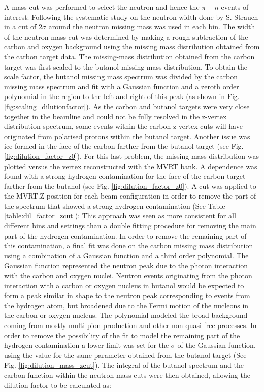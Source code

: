 A mass cut was performed to select the neutron and hence the $\pi + n$ events of interest: Following the systematic study on the neutron width done by S. Strauch in \cite{Strauch_2014} a cut of $2 \sigma$ around the neutron missing mass was used in each bin. The width of the neutron-mass cut was determined by making a rough subtraction of the carbon and oxygen background using the missing mass distribution obtained from the carbon target data. The missing-mass distribution obtained from the carbon target was first scaled to the butanol missing-mass distribution. To obtain the scale factor, the butanol missing mass spectrum was divided by the carbon missing mass spectrum and fit with a Gaussian function and a zeroth order polynomial in the region to the left and right of this peak (as shown in Fig. \ref{fig:scaling_dilutionfactor}). 
As the carbon and butanol targets were very close together in the beamline and could not be fully resolved in the z-vertex distribution spectrum, some events within the carbon z-vertex cuts will have originated from polarised protons within the butanol target. Another issue was ice formed in the face of the carbon farther from the butanol target (see Fig. \ref{fig:dilution_factor_z0}). For this last problem, the missing mass distribution was plotted versus the vertex reconstructed with the MVRT bank. A dependence was found with a strong hydrogen contamination for the face of the carbon target farther from the butanol (see Fig. \ref{fig:dilution_factor_z0}). A cut was applied to the MVRT.Z position for each beam configuration in order to remove the part of the spectrum that showed a strong hydrogen contamination (See Table \ref{table:dil_factor_zcut}): This approach was seen as more consistent for all different bins and settings than a double fitting procedure for removing the main part of the hydrogen contamination. In order to remove the remaining part of this contamination, a final fit was done on the carbon missing mass distribution using a combination of a Gaussian function and a third order polynomial. The Gaussian function represented the neutron peak due to the photon interaction with the carbon and oxygen nuclei. Neutron events originating from the photon interaction with a carbon or oxygen nucleus in butanol would be expected to form a peak similar in shape to the neutron peak corresponding to events from the hydrogen atom, but broadened due to the Fermi motion of the nucleons in the carbon or oxygen nucleus. The polynomial modeled the broad background coming from mostly multi-pion production and other non-quasi-free processes. In order to remove the possibility of the fit to model the remaining part of the hydrogen contamination a lower limit was set for the $\sigma$ of the Gaussian function, using the value for the same parameter obtained from the butanol target (See Fig. \ref{fig:dilution_mass_zcut}). The integral of the butanol spectrum and the carbon function within the neutron mass cuts were then obtained, allowing the dilution factor to be calculated as:
